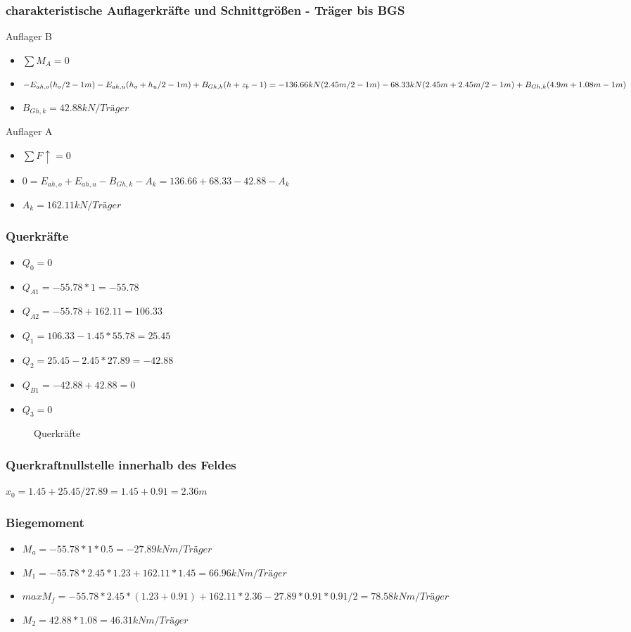 \documentclass[11pt,fleqn,a4paper,halfparskip]{article}
\begin{document}
\subsubsection*{charakteristische Auflagerkräfte und Schnittgrößen - Träger bis BGS}
Auflager B
\begin{itemize}
\item[] $\sum M_A = 0$
\item[] $ -E_{ah,o} (h_o/2 -1m)-E_{ah,u}(h_o+h_u/2 -1m) + B_{Gh,k} (h + z_b -1) \\ = -136.66kN (2.45m/2-1m) - 68.33kN(2.45m + 2.45m/2 -1m) + B_{Gh,k}(4.9m+1.08m-1m)$
\item[] $B_{Gh,k} = 42.88kN/Träger$
\end{itemize}
Auflager A
\begin{itemize}
\item[] $\sum F\uparrow = 0$
\item[] $ 0 = E_{ah,o}+E_{ah,u} - B_{Gh,k} - A_k = 136.66 + 68.33 - 42.88 - A_k$
\item[] $A_k = 162.11kN/Träger$
\end{itemize}
\subsubsection*{Querkräfte}
\begin{itemize}
\item[] $Q_0 = 0$
\item[] $Q_{A1} = -55.78*1 = -55.78$
\item[] $Q_{A2} = -55.78 + 162.11 = 106.33$
\item[] $Q_1 = 106.33 - 1.45*55.78 = 25.45$
\item[] $Q_2 = 25.45 - 2.45*27.89 = -42.88$
\item[] $Q_{B1} = -42.88 + 42.88 = 0$
\item[] $Q_3 = 0$
\end{itemize}
\begin{figure}[h]
\vspace{8cm}
\caption[Querkraftverlauf Aufgabe 2]{Querkräfte \cite{me}}
\end{figure}
\newpage
\subsubsection*{Querkraftnullstelle innerhalb des Feldes}
$x_0 = 1.45 + 25.45/27.89 = 1.45 + 0.91 = 2.36m$
\subsubsection*{Biegemoment}
\begin{itemize}
\item[] $M_a = -55.78*1*0.5 = -27.89kNm/Träger$
\item[] $M_1 = -55.78*2.45*1.23 + 162.11*1.45 = 66.96kNm/Träger$
\item[] $maxM_f = -55.78 * 2.45 * (1.23 + 0.91) + 162.11*2.36 - 27.89*0.91*0.91/2= 78.58kNm/Träger$
\item[] $M_2 = 42.88*1.08 = 46.31kNm/Träger$
\end{itemize}
\end{document}

